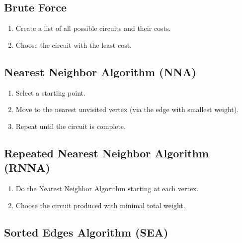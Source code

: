 \subsection{Brute Force}%
\label{sub:brute-force}

\begin{algorithm}
  \begin{enumerate}
  \item Create a list of all possible circuits and their costs.
  \item Choose the circuit with the least cost.
  \end{enumerate}
\end{algorithm}

\subsection{Nearest Neighbor Algorithm (NNA)}%
\label{sub:nearest-neighbor}

\begin{algorithm}
  \begin{enumerate}
  \item Select a starting point.
  \item Move to the nearest unvisited vertex (via the edge with
    smallest weight).
  \item Repeat until the circuit is complete.
  \end{enumerate}
\end{algorithm}

\subsection{Repeated Nearest Neighbor Algorithm (RNNA)}%
\label{sub:repeated-nearest-neighbor}

\begin{algorithm}
  \begin{enumerate}
  \item Do the Nearest Neighbor Algorithm starting at each vertex.
  \item Choose the circuit produced with minimal total weight.
  \end{enumerate}
\end{algorithm}

\subsection{Sorted Edges Algorithm (SEA)}%
\label{sub:sorted-edges}

